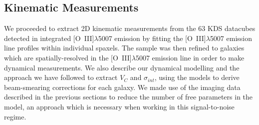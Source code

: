 \documentclass[fleqn,usenatbib]{mnras}
\begin{document}

\subsection{Kinematic Measurements}\label{subsection:kinematic_measurements}

We proceeded to extract 2D kinematic measurements from the 63 KDS datacubes detected in integrated [O~{\sc III}]$\lambda$5007 emission by fitting the [O~{\sc III}]$\lambda$5007 emission line profiles within individual spaxels.
The sample was then refined to galaxies which are spatially-resolved in the [O~{\sc III}]$\lambda$5007 emission line in order to make dynamical measurements.
We also describe our dynamical modelling and the approach we have followed to extract $V_{C}$ and $\sigma_{int}$, using the models to derive beam-smearing corrections for each galaxy.
We made use of the imaging data described in the previous sections to reduce the number of free parameters in the model, an approach which is necessary when working in this signal-to-noise regime.  
\end{document}
